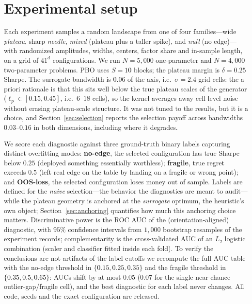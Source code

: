 \documentclass[11pt]{article}
\begin{document}
\section{Experimental setup}
\label{sec:setup}

Each experiment samples a random landscape from one of four families---wide
\emph{plateau}, sharp \emph{needle}, \emph{mixed} (plateau plus a taller spike),
and \emph{null} (no edge)---with randomized amplitudes, widths, centers, factor
share and in-sample length, on a grid of $41^d$ configurations. We run
$N{=}5{,}000$ one-parameter and $N{=}4{,}000$ two-parameter problems. PBO uses
$S{=}10$ blocks; the plateau margin is $\delta{=}0.25$ Sharpe. The surrogate
bandwidth is $0.06$ of the axis, i.e.\ $\sigma = 2.4$ grid cells: the a-priori
rationale is that this sits well below the true plateau scales of the generator
($\ell_p \in [0.15, 0.45]$, i.e.\ $6$--$18$ cells), so the kernel averages away
cell-level noise without erasing plateau-scale structure. It was not tuned to
the results, but it is a choice, and Section~\ref{sec:selection} reports the
selection payoff across bandwidths $0.03$--$0.16$ in both dimensions, including
where it degrades.

We score each diagnostic against three ground-truth binary labels capturing
distinct overfitting modes: \textbf{no-edge}, the selected configuration has true
Sharpe below $0.25$ (deployed something essentially worthless); \textbf{fragile},
true regret exceeds $0.5$ (left real edge on the table by landing on a fragile or
wrong point); and \textbf{OOS-loss}, the selected configuration loses money out of
sample. Labels are defined for the \emph{naive} selection---the behavior the
diagnostics are meant to audit---while the plateau geometry is anchored at the
\emph{surrogate} optimum, the heuristic's own object; Section~\ref{sec:anchoring}
quantifies how much this anchoring choice matters. Discriminative power is the
ROC AUC of the (orientation-aligned) diagnostic, with $95\%$ confidence
intervals from $1{,}000$ bootstrap resamples of the experiment records;
complementarity is the cross-validated AUC of an $L_2$ logistic combination
(scaler and classifier fitted inside each fold). To verify the conclusions are
not artifacts of the label cutoffs we recompute the full AUC table with the
no-edge threshold in $\{0.15, 0.25, 0.35\}$ and the fragile threshold in
$\{0.35, 0.5, 0.65\}$: AUCs shift by at most $0.05$ ($0.07$ for the single
near-chance outlier-gap/fragile cell), and the best diagnostic for each label
never changes. All code, seeds and the exact configuration are released.
\end{document}
